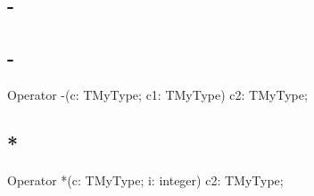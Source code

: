 \documentclass{report}
\newif\ifpdf
\begin{document}
\subsection*{\large{\textbf{-}}\normalsize\hspace{1ex}\hrulefill}
\else
\subsection*{-}
\fi
\label{ok_operator_test--}
\index{-}
\begin{list}{}{
\setlength{\itemindent}{0cm}
\setlength{\listparindent}{0cm}
\setlength{\leftmargin}{\evensidemargin}
\addtolength{\leftmargin}{\tmplength}
\settowidth{\labelsep}{X}
\addtolength{\leftmargin}{\labelsep}
\setlength{\labelwidth}{\tmplength}
}
\item[\textbf{Declaration}\hfill]
\ifpdf
\begin{flushleft}
\fi
\begin{ttfamily}
Operator -(c: TMyType; c1: TMyType) c2: TMyType;\end{ttfamily}

\ifpdf
\end{flushleft}
\fi

\end{list}
\ifpdf
\subsection*{\large{\textbf{*}}\normalsize\hspace{1ex}\hrulefill}
\else
\subsection*{*}
\fi
\label{ok_operator_test-*}
\index{*}
\begin{list}{}{
\setlength{\itemindent}{0cm}
\setlength{\listparindent}{0cm}
\setlength{\leftmargin}{\evensidemargin}
\addtolength{\leftmargin}{\tmplength}
\settowidth{\labelsep}{X}
\addtolength{\leftmargin}{\labelsep}
\setlength{\labelwidth}{\tmplength}
}
\item[\textbf{Declaration}\hfill]
\ifpdf
\begin{flushleft}
\fi
\begin{ttfamily}
Operator *(c: TMyType; i: integer) c2: TMyType;\end{ttfamily}

\ifpdf
\end{flushleft}
\fi

\end{list}
\ifpdf
\end{document}
